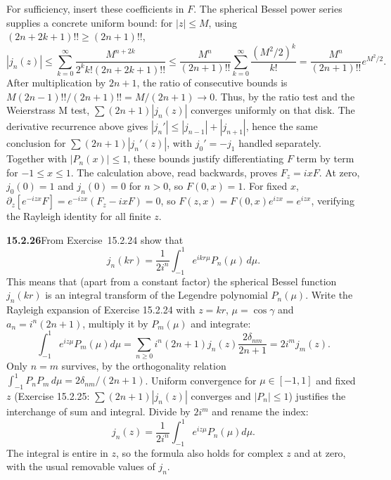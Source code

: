 For sufficiency, insert these coefficients in $F$. The spherical
Bessel power series supplies a concrete uniform bound: for $|z|\le M$,
using $(2n+2k+1)!!\ge(2n+1)!!$,
\[
|j_n(z)|\le\sum_{k=0}^\infty
\frac{M^{n+2k}}{2^kk!(2n+2k+1)!!}
\le\frac{M^n}{(2n+1)!!}\sum_{k=0}^\infty\frac{(M^2/2)^k}{k!}
=\frac{M^n}{(2n+1)!!}e^{M^2/2}.
\]
After multiplication by $2n+1$, the ratio of consecutive bounds is
$M(2n-1)!!/(2n+1)!!=M/(2n+1)\to0$. Thus, by the ratio test and the
Weierstrass M test, $\sum(2n+1)|j_n(z)|$ converges uniformly on that
disk. The derivative recurrence above gives
$|j_n'|\le|j_{n-1}|+|j_{n+1}|$, hence the same conclusion for
$\sum(2n+1)|j_n'(z)|$, with $j_0'=-j_1$ handled separately.
Together with $|P_n(x)|\le1$, these bounds justify differentiating
$F$ term by term for $-1\le x\le1$.
The calculation above, read backwards, proves $F_z=ixF$. At zero,
$j_0(0)=1$ and $j_n(0)=0$ for $n>0$, so $F(0,x)=1$.
For fixed $x$, $\partial_z[e^{-izx}F]=e^{-izx}(F_z-ixF)=0$, so
$F(z,x)=F(0,x)e^{izx}=e^{izx}$, verifying the Rayleigh identity for all
finite $z$.

\par\bigskip
\noindent\textbf{15.2.26}\quad From Exercise~15.2.24 show that
\[
j_{n}(kr)=\frac{1}{2i^{n}}\int_{-1}^{1}e^{ikr\mu}P_{n}(\mu)\,d\mu.
\]
This means that (apart from a constant factor) the spherical Bessel
function $j_{n}(kr)$ is an integral transform of the Legendre
polynomial $P_{n}(\mu)$.
\solution
Write the Rayleigh expansion of Exercise 15.2.24 with $z=kr$,
$\mu=\cos\gamma$ and $a_n=i^n(2n+1)$, multiply it by $P_m(\mu)$ and
integrate:
\[
\int_{-1}^1e^{iz\mu}P_m(\mu)d\mu
=\sum_{n\ge0}i^n(2n+1)j_n(z)
 \frac{2\delta_{nm}}{2n+1}
=2i^mj_m(z).
\]
Only $n=m$ survives, by the orthogonality relation
$\int_{-1}^1P_nP_m\,d\mu=2\delta_{nm}/(2n+1)$. Uniform convergence for
$\mu\in[-1,1]$ and fixed $z$ (Exercise 15.2.25: $\sum(2n+1)|j_n(z)|$
converges and $|P_n|\le1$) justifies the interchange of sum and
integral. Divide by $2i^m$ and rename the index:
\[
\boxed{j_n(z)=\frac1{2i^n}\int_{-1}^1e^{iz\mu}P_n(\mu)d\mu}.
\]
The integral is entire in $z$, so the formula also holds for complex
$z$ and at zero, with the usual removable values of $j_n$.

